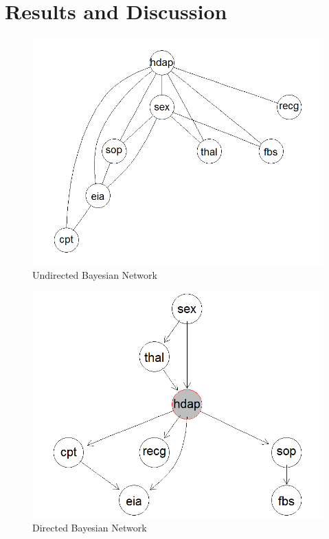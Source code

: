 \documentclass[conference]{IEEEtran}
\begin{document}
\section{Results and Discussion}
\begin{figure}[!ht]
\centering
\includegraphics[width=\columnwidth]{bn_statloghealth_undirected}
\caption{Undirected Bayesian Network}
\label{fig_statloghealth_undirected}
\end{figure}

\begin{figure}[!ht]
\centering
\includegraphics[width=\columnwidth]{bn_statloghealth}
\caption{Directed Bayesian Network}
\label{fig_statloghealth}
\end{figure}
\end{document}
